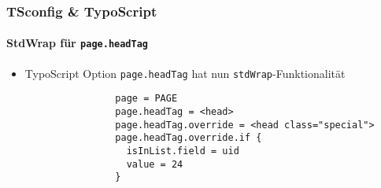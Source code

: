 %

\begin{frame}[fragile]
	\frametitle{TSconfig \& TypoScript}
	\framesubtitle{StdWrap für \texttt{page.headTag}}

	\begin{itemize}
		\item TypoScript Option \texttt{page.headTag} hat nun \texttt{stdWrap}-Funktionalität

			\begin{lstlisting}
				page = PAGE
				page.headTag = <head>
				page.headTag.override = <head class="special">
				page.headTag.override.if {
		  		  isInList.field = uid
		  		  value = 24
				}
			\end{lstlisting}

	\end{itemize}

\end{frame}


